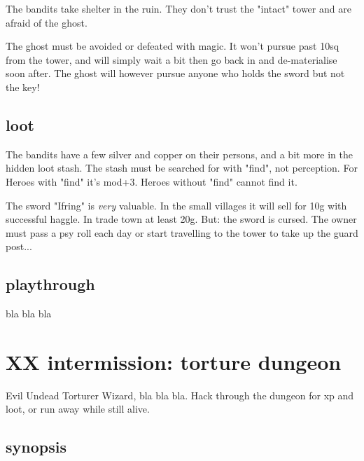 The bandits take shelter in the ruin. They don't trust the "intact" tower and are afraid of the ghost.

The ghost must be avoided or defeated with magic. It won't pursue past 10sq from the tower, and will simply wait a bit then go back in and de-materialise soon after. The ghost will however pursue anyone who holds the sword but not the key!


\subsection*{loot}

The bandits have a few silver and copper on their persons, and a bit more in the hidden loot stash. The stash must be searched for with "find", not perception. For Heroes with "find" it's mod+3. Heroes without "find" cannot find it.

The sword "Ifring" is \emph{very} valuable. In the small villages it will sell for 10g with successful haggle. In trade town at least 20g. But: the sword is cursed. The owner must pass a psy roll each day or start travelling to the tower to take up the guard post...


\subsection*{playthrough}

bla bla bla







\newpage
\section*{XX intermission: torture dungeon}

Evil Undead Torturer Wizard, bla bla bla. Hack through the dungeon for xp and loot, or run away while still alive.


\subsection*{synopsis}

